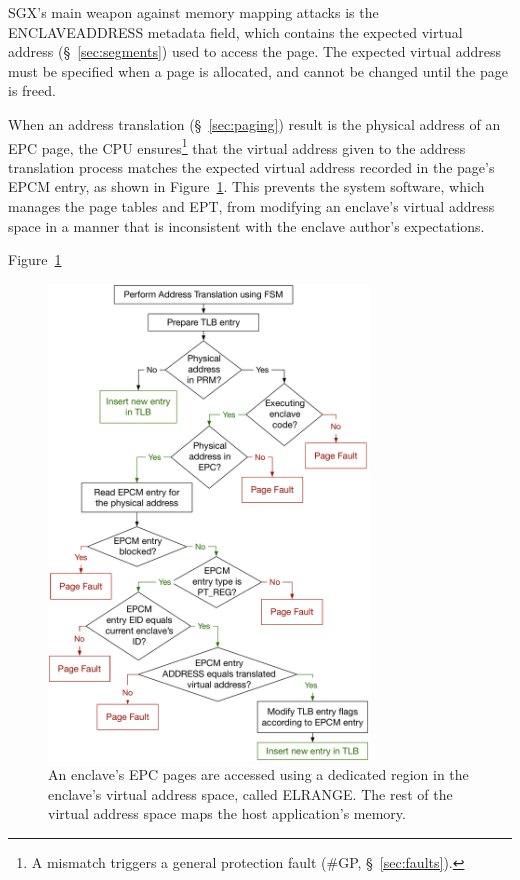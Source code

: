 
SGX's main weapon against memory mapping attacks is the ENCLAVEADDRESS metadata
field, which contains the expected virtual address (\S~\ref{sec:segments}) used
to access the page. The expected virtual address must be specified when a page
is allocated, and cannot be changed until the page is freed.

When an address translation (\S~\ref{sec:paging}) result is the physical
address of an EPC page, the CPU ensures\footnote{A mismatch triggers a general
protection fault (\#GP, \S~\ref{sec:faults}).} that the virtual address given
to the address translation process matches the expected virtual address
recorded in the page's EPCM entry, as shown in
Figure~\ref{fig:sgx_tlb_miss_checks}. This prevents the system software, which
manages the page tables and EPT, from modifying an enclave's virtual address
space in a manner that is inconsistent with the enclave author's expectations.


Figure~\ref{fig:sgx_tlb_miss_checks}

\begin{figure}[hbt]
  \centering
  \includegraphics[width=85mm]{figures/sgx_tlb_miss_checks.pdf}
  \caption{
    An enclave's EPC pages are accessed using a dedicated region in the
    enclave's virtual address space, called ELRANGE. The rest of the virtual
    address space maps the host application's memory.
  }
  \label{fig:sgx_tlb_miss_checks}
\end{figure}


